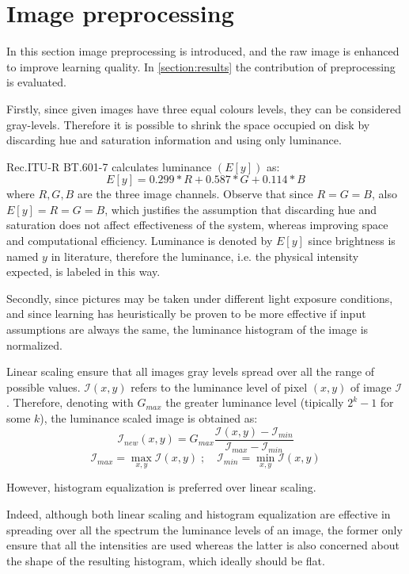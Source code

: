 \section{Image preprocessing}\label{section:image_preprocessing}
    \par{
        In this section image preprocessing is introduced, and the raw image is enhanced to improve learning quality. In \ref{section:results} the contribution of preprocessing is evaluated.
    }
    \par{
        Firstly, since given images have three equal colours levels, they can be considered gray-levels. Therefore it is possible to shrink the space occupied on disk by discarding hue and saturation information and using only luminance.
    }
    \par{
        Rec.ITU-R BT.601-7 calculates luminance $\left(E\left[y\right]\right)$ as:
        $$ E\left[y\right] = 0.299 * R + 0.587 * G + 0.114 * B $$
        where $R,G,B$ are the three image channels. Observe that since $R = G = B$, also $E\left[y\right] = R = G = B$, which justifies the assumption that discarding hue and saturation does not affect effectiveness of the system, whereas improving space and computational efficiency. Luminance is denoted by $E\left[y\right]$ since brightness is named $y$ in literature, therefore the luminance, i.e. the physical intensity expected, is labeled in this way.
    }
    \par{
        Secondly, since pictures may be taken under different light exposure conditions, and since learning has heuristically be proven to be more effective if input assumptions are always the same, the luminance histogram of the image is normalized.
    }
    \par{
        Linear scaling ensure that all images gray levels spread over all the range of possible values. $\mathcal{I}\left(x,y\right)$ refers to the luminance level of pixel $\left(x,y\right)$ of image $\mathcal{I}$. Therefore, denoting with $G_{max}$ the greater luminance level (tipically $2^k - 1$ for some $k$), the luminance scaled image is obtained as:
        $$\mathcal{I}_{new}\left(x,y\right) = G_{max} \frac{\mathcal{I}\left(x,y\right) - \mathcal{I}_{min}}{\mathcal{I}_{max} - \mathcal{I}_{min}}$$
        $$\mathcal{I}_{max} = \max_{x,y} \mathcal{I}\left(x,y\right)\;;\quad\mathcal{I}_{min} = \min_{x,y} \mathcal{I}\left(x,y\right)$$
    }
    \par{
        However, histogram equalization is preferred over linear scaling.
    }
    \par{
        Indeed, although both linear scaling and histogram equalization are effective in spreading over all the spectrum the luminance levels of an image, the former only ensure that all the intensities are used whereas the latter is also concerned about the shape of the resulting histogram, which ideally should be flat.
    }
